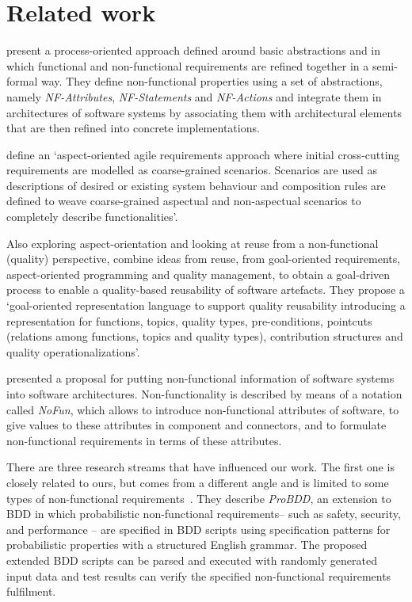 \documentclass[dissertation,final]{softeng}
\newcommand{\nfrs}{non-functional requirements\xspace}
\begin{document}
\section{Related work}
\citet{Rosa2004} present a process-oriented approach defined around basic abstractions and in which functional and non-functional requirements are refined together in a semi-formal way. They define non-functional properties using a set of abstractions, namely \emph{NF-Attributes}, \emph{NF-Statements} and \emph{NF-Actions} and integrate them in architectures of software systems by associating them with architectural elements that are then refined into concrete implementations.

\citet{Araujo2005} define an `aspect-oriented agile requirements approach where initial cross-cutting requirements are modelled as coarse-grained scenarios. Scenarios are used as descriptions of desired or existing system behaviour and composition rules are defined to weave coarse-grained aspectual and non-aspectual scenarios to completely describe functionalities'.

Also exploring aspect-orientation and looking at reuse from a non-functional (quality) perspective, \citet{Leite2005} combine ideas from reuse, from goal-oriented requirements, aspect-oriented programming and quality management, to obtain a goal-driven process to enable a quality-based reusability of software artefacts. They propose a `goal-oriented representation language to support quality reusability introducing a representation for functions, topics, quality types, pre-conditions, pointcuts (relations among functions, topics and quality types), contribution structures and quality operationalizations'.

\citet{Franch1998} presented a proposal for putting non-functional information of software systems into software architectures. Non-functionality is described by means of a notation called \emph{NoFun}, which allows to introduce non-functional attributes of software, to give values to these attributes in component and connectors, and to formulate non-functional requirements in terms of these attributes.

There are three research streams that have influenced our work. The first one is closely related to ours, but comes from a different angle and is limited to some types of \nfrs~\citep{barmi2011automated}. They describe \emph{ProBDD}, an extension to BDD in which probabilistic \nfrs -- such as safety, security, and performance -- are specified in BDD scripts using specification patterns for probabilistic properties with a structured English grammar. The proposed extended BDD scripts can be parsed and executed with randomly generated input data and test results can verify the specified \nfrs fulfilment. 
\end{document}
